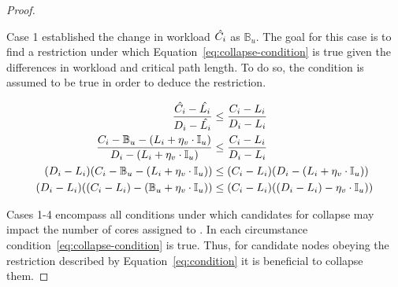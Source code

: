 \begin{theorem}
\begin{proof}
\begin{case}
      Case 1 established the change in workload
      ${\hat{\workload{i}}}$ as ${\mathbb{B}_u}$. The goal for this
      case is to find a restriction under which
      Equation~\ref{eq:collapse-condition} is true given the
      differences in workload and critical path length. To do so, the
      condition is assumed to be true in order to deduce the restriction.

      \begin{align*}
        \indent
        \frac{\hat{\workload{i}} - \hat{\criticalpathlen{i}}} 
             {\Deadline{i} - \hat{\criticalpathlen{i}}} &\le
        \frac{\workload{i} - \criticalpathlen{i}}
             {\Deadline{i} - \criticalpathlen{i}} \\
        \frac{\workload{i} - \mathbb{B}_u - (\criticalpathlen{i} + \eta_v
          \cdot \mathbb{I}_u)} 
             {\Deadline{i} - (\criticalpathlen{i} + \eta_v
          \cdot \mathbb{I}_u)} &\le
        \frac{\workload{i} - \criticalpathlen{i}}
             {\Deadline{i} - \criticalpathlen{i}} \\
        (D_i - L_i)(C_i - \mathbb{B}_u - (L_i + \eta_v \cdot \mathbb{I}_u))
             &\le
             (C_i - L_i)(D_i - (L_i + \eta_v \cdot \mathbb{I}_u)) \\
        (D_i - L_i)((C_i - L_i) - (\mathbb{B}_u + \eta_v \cdot \mathbb{I}_u))
             &\le
             (C_i - L_i)((D_i - L_i) - \eta_v \cdot \mathbb{I}_u)) \\
      \end{align*}
      
      
    \end{case}

    \begin{case}
    \end{case}
    \begin{case}
    \end{case}

    
    Cases 1-4 encompass all conditions under which candidates for
    collapse may impact the number of cores assigned to . In
    each circumstance condition~\ref{eq:collapse-condition} is true. Thus, for
    candidate nodes obeying the restriction described by
    Equation~\ref{eq:condition} it is beneficial to collapse them. 
  \end{proof}
\end{theorem}
